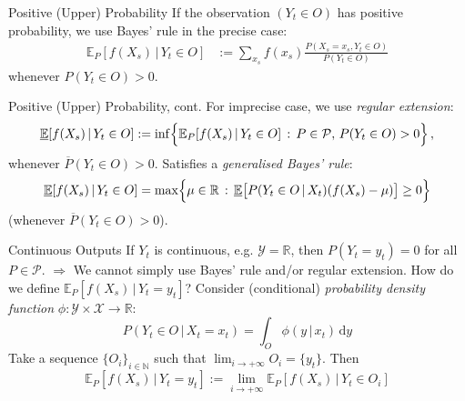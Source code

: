 \documentclass{beamer}
\begin{document}
\begin{frame}{Positive (Upper) Probability}
If the observation $(Y_t\in O)$ has positive probability, we use Bayes' rule in the precise case:
\begin{align*}
\mathbb{E}_P[f(X_s)\,\vert\, Y_t\in O] &:= \sum_{x_s} f(x_s)\frac{P(X_s=x_s,Y_t\in O)}{P(Y_t\in O)} %
\end{align*}
whenever $P(Y_t\in O)>0$.%
\end{frame}

\begin{frame}{Positive (Upper) Probability, cont.}
For imprecise case, we use \emph{regular extension}:
\begin{equation*}
\underline{\mathbb{E}}[f(X_s)\,\vert\, Y_t\in O] := \inf\Bigl\{ \mathbb{E}_P[f(X_s)\,\vert\, Y_t\in O]\,:\, P\in\mathcal{P},\,P(Y_t\in O)>0 \Bigr\}\,,
\end{equation*}
whenever $\overline{P}(Y_t\in O)>0$.%
\newline\newline\newline
Satisfies a \emph{generalised Bayes' rule}:
\begin{equation*}
\underline{\mathbb{E}}[f(X_s)\,\vert\, Y_t\in O] = \max\Bigl\{ \mu\in\mathbb{R}\,:\, \underline{\mathbb{E}}\bigl[P(Y_t\in O\,\vert\,X_t)(f(X_s) - \mu)\bigr] \geq 0 \Bigr\}
\end{equation*}
(whenever $\overline{P}(Y_t\in O)>0$).
\end{frame}

\begin{frame}{Continuous Outputs}
If $Y_t$ is continuous, e.g. $\mathcal{Y}=\mathbb{R}$, then $P(Y_t=y_t)=0$ for all $P\in\mathcal{P}$.
\newline
$\Rightarrow$ We cannot simply use Bayes' rule and/or regular extension.
\newline\newline
How do we define $\mathbb{E}_P[f(X_s)\,\vert\,Y_t=y_t]$?
\newline\newline
Consider (conditional) \emph{probability density function} $\phi:\mathcal{Y}\times \mathcal{X}\to\mathbb{R}$:
\begin{equation*}
P(Y_t\in O\,\vert\,X_t=x_t) = \int_{O}\phi(y\,\vert\,x_t)\,\mathrm{d}y
\end{equation*}
\newline\newline
Take a sequence $\{O_i\}_{i\in\mathbb{N}}$ such that $\lim_{i\to+\infty}O_i=\{y_t\}$. Then
\begin{equation*}
\mathbb{E}_P[f(X_s)\,\vert\,Y_t=y_t] := \lim_{i\to+\infty} \mathbb{E}_P[f(X_s)\,\vert\,Y_t\in O_i]
\end{equation*}
\end{frame}
\end{document}
